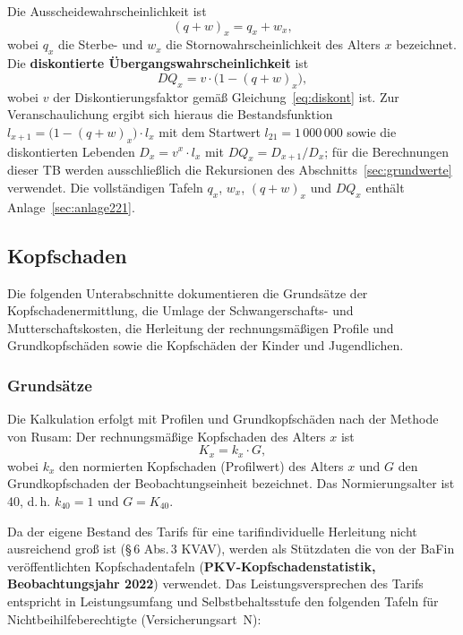 Die Ausscheidewahrscheinlichkeit ist
\begin{equation}
(q+w)_x = q_x + w_x,
\label{eq:qw}
\end{equation}
wobei $q_x$ die Sterbe- und $w_x$ die Stornowahrscheinlichkeit des
Alters $x$ bezeichnet. Die \textbf{diskontierte
Übergangswahrscheinlichkeit} ist
\begin{equation}
DQ_x = v\cdot\bigl(1-(q+w)_x\bigr),
\label{eq:dq}
\end{equation}
wobei $v$ der Diskontierungsfaktor gemäß Gleichung~\eqref{eq:diskont}
ist. Zur Veranschaulichung ergibt sich hieraus die Bestandsfunktion
$l_{x+1} = \bigl(1-(q+w)_x\bigr)\cdot l_x$ mit dem Startwert
$l_{21} = 1\,000\,000$ sowie die diskontierten Lebenden
$D_x = v^x\cdot l_x$ mit $DQ_x = D_{x+1}/D_x$; für die Berechnungen
dieser TB werden ausschließlich die Rekursionen des
Abschnitts~\ref{sec:grundwerte} verwendet. Die vollständigen Tafeln
$q_x$, $w_x$, $(q+w)_x$ und $DQ_x$ enthält Anlage~\ref{sec:anlage221}.

\subsection{Kopfschaden}\label{sec:kopfschaden}

Die folgenden Unterabschnitte dokumentieren die Grundsätze der
Kopfschadenermittlung, die Umlage der Schwangerschafts- und
Mutterschaftskosten, die Herleitung der rechnungsmäßigen Profile und
Grundkopfschäden sowie die Kopfschäden der Kinder und Jugendlichen.

\subsubsection{Grundsätze}\label{sec:kopfschaden-grundsaetze}

Die Kalkulation erfolgt mit Profilen und Grundkopfschäden nach der
Methode von Rusam: Der rechnungsmäßige Kopfschaden des Alters $x$ ist
\begin{equation}
K_x = k_x \cdot G,
\label{eq:rusam}
\end{equation}
wobei $k_x$ den normierten Kopfschaden (Profilwert) des Alters $x$ und
$G$ den Grundkopfschaden der Beobachtungseinheit bezeichnet. Das
Normierungsalter ist 40, d.\,h. $k_{40} = 1$ und $G = K_{40}$.

Da der eigene Bestand des Tarifs für eine tarifindividuelle Herleitung
nicht ausreichend groß ist (\S\,6 Abs.\,3 KVAV), werden als Stützdaten
die von der BaFin veröffentlichten Kopfschadentafeln
(\textbf{PKV-Kopfschadenstatistik, Beobachtungsjahr 2022}) verwendet.
Das Leistungsversprechen des Tarifs entspricht in Leistungsumfang und
Selbstbehaltsstufe den folgenden Tafeln für Nichtbeihilfeberechtigte
(Versicherungsart~N):


